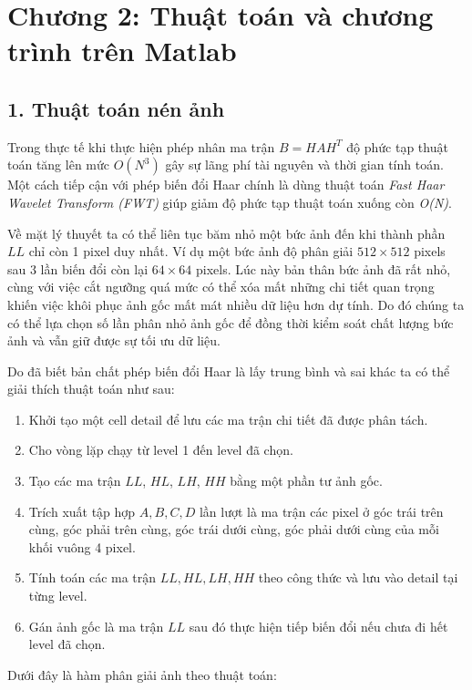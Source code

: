 \section*{Chương 2: Thuật toán và chương trình trên Matlab}

\subsection*{1. Thuật toán nén ảnh}
Trong thực tế khi thực hiện phép nhân ma trận $B = HAH^T$ độ phức tạp thuật toán tăng lên mức 
$O(N^3)$ gây sự lãng phí tài nguyên và thời gian tính toán. Một cách tiếp cận với phép biến đổi Haar
chính là dùng thuật toán \textit{Fast Haar Wavelet Transform (FWT)} giúp giảm độ phức tạp
thuật toán xuống còn \textit{O(N)}. 

Về mặt lý thuyết ta có thể liên tục băm nhỏ một bức ảnh đến khi thành phần $LL$ chỉ còn 1 pixel duy nhất.
Ví dụ một bức ảnh độ phân giải $512 \times 512$ pixels sau 3 lần biến đổi còn lại $64 \times 64$ pixels.
Lúc này bản thân bức ảnh đã rất nhỏ, cùng với việc cắt ngưỡng quá mức có thể xóa mất những chi tiết quan trọng
khiến việc khôi phục ảnh gốc mất mát nhiều dữ liệu hơn dự tính. Do đó chúng ta có thể lựa chọn
số lần phân nhỏ ảnh gốc để đồng thời kiểm soát chất lượng bức ảnh và vẫn giữ được sự tối ưu dữ liệu.

Do đã biết bản chất phép biến đổi Haar là lấy trung bình và sai khác ta có thể giải thích thuật toán như sau:
\begin{enumerate}
    \item Khởi tạo một cell detail để lưu các ma trận chi tiết đã được phân tách.
    \item Cho vòng lặp chạy từ level 1 đến level đã chọn.
    \item Tạo các ma trận $LL$, $HL$, $LH$, $HH$ bằng một phần tư ảnh gốc.
    \item Trích xuất tập hợp $A, B, C, D$ lần lượt là ma trận các pixel ở góc trái trên cùng, góc phải trên cùng, góc trái dưới cùng, góc phải dưới cùng của mỗi khối vuông 4 pixel.
    \item Tính toán các ma trận $LL, HL, LH, HH$ theo công thức và lưu vào detail tại từng level.
    \item Gán ảnh gốc là ma trận $LL$ sau đó thực hiện tiếp biến đổi nếu chưa đi hết level đã chọn.
\end{enumerate}

Dưới đây là hàm phân giải ảnh theo thuật toán:

